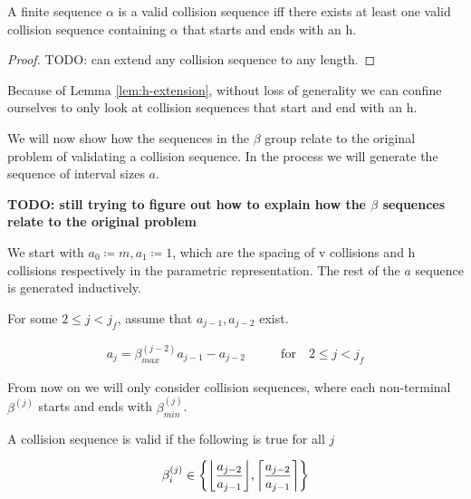 
\begin{lemma}\label{lem:h-extension}
	A finite sequence $\alpha$ is a valid collision sequence iff there exists at least one valid collision sequence containing $\alpha$ that starts and ends with an h.
\end{lemma}

\begin{proof}
	TODO: can extend any collision sequence to any length. 
\end{proof}

Because of Lemma \ref{lem:h-extension}, without loss of generality we can confine ourselves to only look at collision sequences that start and end with an h.


We will now show how the sequences in the $\beta$ group relate to the original problem of validating a collision sequence. In the process we will generate the sequence of interval sizes $a$. 

\textbf{TODO: still trying to figure out how to explain how the $\beta$ sequences relate to the original problem}

We start with $a_0 \coloneqq m, a_1 \coloneqq 1$, which are the spacing of v collisions and h collisions respectively in the parametric representation. The rest of the $a$ sequence is generated inductively. 

For some $2 \le j < j_f$, assume that $a_{j-1}, a_{j-2}$ exist.

\begin{align}
	a_{j} = \beta^{(j-2)}_{max} a_{j-1} - a_{j-2} \qquad &\text{for} \quad 2 \le j < j_f
\end{align}

From now on we will only consider collision sequences, where each non-terminal $\beta^{(j)}$ starts and ends with $\beta^{(j)}_{min}$.


\begin{theorem}\label{thm:beta_i}
	A collision sequence is valid if the following is true for all $j$

	\begin{equation}
		\beta^{(j)}_i \in \cbracket{\floor{\frac{a_{j-2}}{a_{j-1}}}, \ceil{\frac{a_{j-2}}{a_{j-1}}}}
	\end{equation}
\end{theorem}

